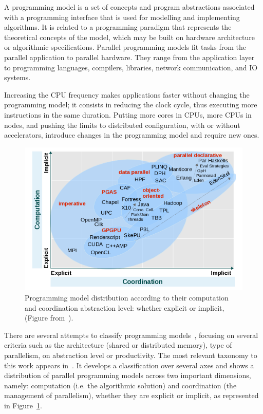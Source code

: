 A programming model is a set of concepts and program abstractions associated with a programming interface that is used for modelling and implementing algorithms. It is related to a programming paradigm that represents the theoretical concepts of the model, which may be built on hardware architecture or algorithmic specifications. 
Parallel programming models fit tasks from the parallel application to parallel hardware. They range from the application layer to programming languages, compilers, libraries, network communication, and IO systems\cite{VITOROVIC2014203_parallel_programming_models}.

Increasing the CPU frequency makes applications faster without changing the programming model; it consists in reducing the clock cycle, thus executing more instructions in the same duration. Putting more cores in CPUs, more CPUs in nodes, and pushing the limits to distributed configuration, with or without accelerators, introduce changes in the programming model and require new ones. 

\begin{figure}[h!]\centering
\includegraphics[scale=0.5]{figures/programming_models.png}
\caption{Programming model distribution according to their computation and coordination abstraction level: whether explicit or implicit, (Figure from~\cite{belikov2013survey}).}
\label{figmodels}
\end{figure}

There are several attempts to classify programming models~\cite{belikov2013survey, nestmann_building_2017, ketata_parallel_2016, thoman_taxonomy_2018, kasim_survey_2008}, focusing on several criteria such as the architecture (shared or distributed memory), type of parallelism, on abstraction level or productivity.  
The most relevant taxonomy to this work appears in~\cite{belikov2013survey}. It develops a classification over several axes and shows a distribution of parallel programming models across two important dimensions, namely: computation (i.e. the algorithmic solution) and coordination (the management of parallelism), whether they are explicit or implicit, as represented in Figure~\ref{figmodels}. 


